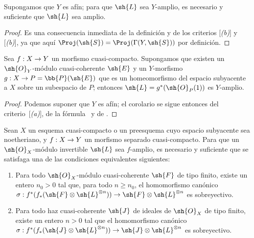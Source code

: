 \documentclass[oneside,10pt]{amsart}
\makeatletter
\renewcommand{\geq}{\geqslant}
\newcommand{\ega@arrow}[2]{\mathchoice{#1}{#2}{#2}{#2}}
\renewcommand{\to}{\ega@arrow{\longrightarrow}{\rightarrow}}
\let\EGAOriginalLabel\label
\renewcommand{\label}[1]{\phantomsection\EGAOriginalLabel{#1}}
\makeatother
\begin{document}
\begin{corollary}[4.6.6]
\label{II.4.6.6}
Supongamos que $Y$ es afín;
para que $\sh{L}$ sea $Y$-amplio, es necesario y suficiente que $\sh{L}$ sea amplio.
\end{corollary}

\begin{proof}
Es una consecuencia inmediata de la definición  y de los criterios [\emph{(b)}] y [\emph{(b)}], ya que aquí $\Proj(\sh{S})=\Proj(\Gamma(Y,\sh{S}))$ por definición.
\end{proof}

\begin{corollary}[4.6.7]
\label{II.4.6.7}
Sea $f:X\to Y$ un morfismo cuasi-compacto.
Supongamos que existen un $\sh{O}_Y$-módulo cuasi-coherente $\sh{E}$ y un $Y$-morfismo $g:X\to P=\bb{P}(\sh{E})$ que es un homeomorfismo del espacio subyacente a $X$ sobre un subespacio de $P$;
entonces $\sh{L}=g^*(\sh{O}_P(1))$ es $Y$-amplio.
\end{corollary}

\begin{proof}
Podemos suponer que $Y$ es afín;
el corolario se sigue entonces del criterio~[\emph{(a)}], de la fórmula~ y de .
\end{proof}

\begin{proposition}[4.6.8]
\label{II.4.6.8}
Sean $X$ un esquema cuasi-compacto o un preesquema cuyo espacio subyacente sea noetheriano, y $f:X\to Y$ un morfismo separado cuasi-compacto.
Para que un $\sh{O}_X$-módulo invertible $\sh{L}$ sea $f$-amplio, es necesario y suficiente que se satisfaga una de las condiciones equivalentes siguientes:
\begin{enumerate}
  \item[\rm{(c)}] Para todo $\sh{O}_X$-módulo cuasi-coherente $\sh{F}$ de tipo finito, existe un entero $n_0>0$ tal que, para todo $n\geq n_0$, el homomorfismo canónico $\sigma:f^*(f_*(\sh{F}\otimes\sh{L}^{\otimes n}))\to\sh{F}\otimes\sh{L}^{\otimes n}$ es sobreyectivo.
  \item[\rm{(c')}] Para todo haz cuasi-coherente $\sh{J}$ de ideales de $\sh{O}_X$ de tipo finito, existe un entero $n>0$ tal que el homomorfismo canónico $\sigma:f^*(f_*(\sh{J}\otimes\sh{L}^{\otimes n}))\to\sh{J}\otimes\sh{L}^{\otimes n}$ es sobreyectivo.
\end{enumerate}
\end{proposition}
\end{document}

